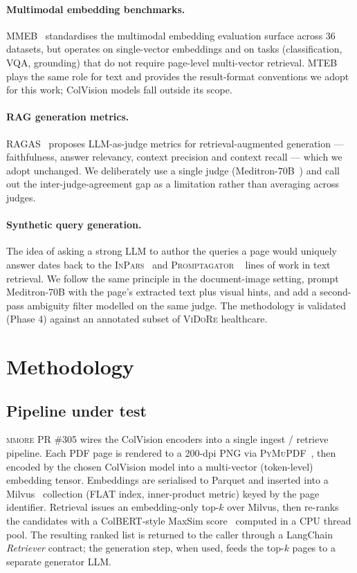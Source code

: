 \documentclass[10pt,a4paper]{article}
\begin{document}
\paragraph{Multimodal embedding benchmarks.}
\textsc{MMEB}~\cite{wei2025mmeb} standardises the multimodal embedding
evaluation surface across 36 datasets, but operates on single-vector
embeddings and on tasks (classification, VQA, grounding) that do not require
page-level multi-vector retrieval. \textsc{MTEB}~\cite{muennighoff2023mteb}
plays the same role for text and provides the result-format conventions we
adopt for this work; ColVision models fall outside its scope.

\paragraph{RAG generation metrics.}
\textsc{RAGAS}~\cite{es2023ragas} proposes LLM-as-judge metrics for
retrieval-augmented generation --- faithfulness, answer relevancy, context
precision and context recall --- which we adopt unchanged. We deliberately
use a single judge (Meditron-70B~\cite{chen2023meditron}) and call out the
inter-judge-agreement gap as a limitation rather than averaging across judges.

\paragraph{Synthetic query generation.} The idea of asking a strong LLM to
author the queries a page would uniquely answer dates back to the
\textsc{InPars}~\cite{bonifacio2022inpars} and \textsc{Promptagator}
~\cite{dai2022promptagator} lines of work in text retrieval. We follow the
same principle in the document-image setting, prompt Meditron-70B with the
page's extracted text plus visual hints, and add a second-pass ambiguity
filter modelled on the same judge. The methodology is validated (Phase 4)
against an annotated subset of \textsc{ViDoRe} healthcare.

\section{Methodology}

\subsection{Pipeline under test}

\textsc{mmore} PR \#305 wires the ColVision encoders into a single ingest /
retrieve pipeline. Each PDF page is rendered to a 200-dpi PNG via
\textsc{PyMuPDF}~\cite{pymupdf}, then encoded by the chosen ColVision model
into a multi-vector (token-level) embedding tensor. Embeddings are
serialised to Parquet and inserted into a Milvus~\cite{wang2021milvus}
collection (\textsc{FLAT} index, inner-product metric) keyed by the page
identifier. Retrieval issues an embedding-only top-$k$ over Milvus, then
re-ranks the candidates with a ColBERT-style MaxSim score~\cite{khattab2020colbert}
computed in a CPU thread pool. The resulting ranked list is returned to the
caller through a LangChain \textit{Retriever} contract; the generation step,
when used, feeds the top-$k$ pages to a separate generator LLM.
\end{document}

